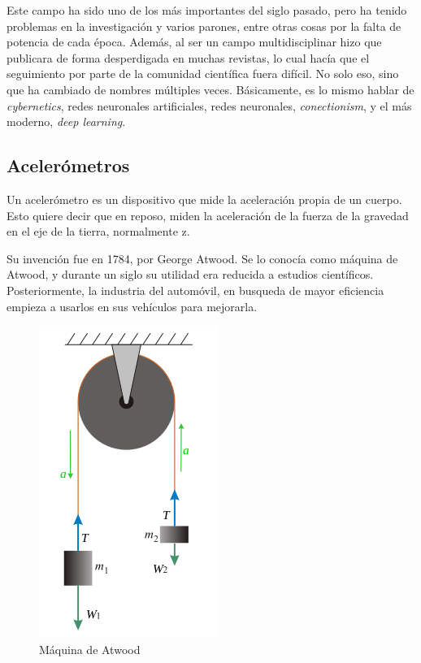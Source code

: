 \documentclass[12pt]{article}
\numberwithin{equation}{section}
\begin{document}
Este campo ha sido uno de los más importantes del siglo pasado, pero ha tenido problemas en la investigación y varios parones, entre otras cosas por la falta de potencia de cada época. Además, al ser un campo multidisciplinar hizo que publicara de forma desperdigada en muchas revistas, lo cual hacía que el seguimiento por parte de la comunidad científica fuera difícil. No solo eso, sino que ha cambiado de nombres múltiples veces. Básicamente, es lo mismo hablar de \textit{cybernetics}, redes neuronales artificiales, redes neuronales, \textit{conectionism}, y el más moderno, \textit{deep learning}.

\subsection{Acelerómetros}

Un acelerómetro es un dispositivo que mide la aceleración propia de un cuerpo. Esto quiere decir que en reposo, miden la aceleración de la fuerza de la gravedad en el eje de la tierra, normalmente z.

Su invención fue en 1784, por George Atwood. Se lo conocía como máquina de Atwood, y durante un siglo su utilidad era reducida a estudios científicos. Posteriormente, la industria del automóvil, en busqueda de mayor eficiencia empieza a usarlos en sus vehículos para mejorarla.

\begin{figure}[h]
    \centering
    \includegraphics[scale=0.5]{atwood.png}
    \caption{Máquina de Atwood}
    \label{fig:atwood}
\end{figure}
\end{document}
